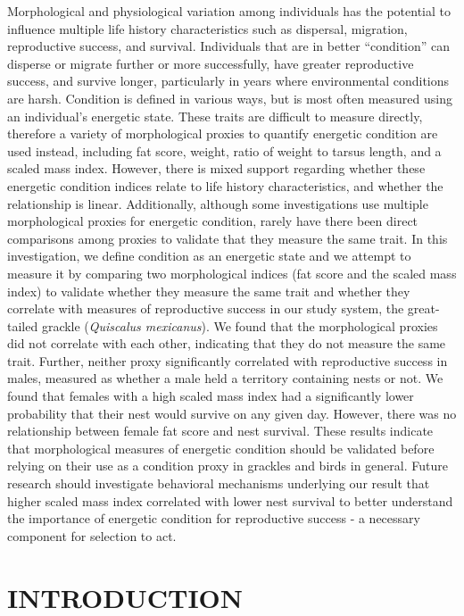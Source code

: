 \documentclass[
]{article}
\begin{document}
Morphological and physiological variation among individuals has the
potential to influence multiple life history characteristics such as
dispersal, migration, reproductive success, and survival. Individuals
that are in better ``condition'' can disperse or migrate further or more
successfully, have greater reproductive success, and survive longer,
particularly in years where environmental conditions are harsh.
Condition is defined in various ways, but is most often measured using
an individual's energetic state. These traits are difficult to measure
directly, therefore a variety of morphological proxies to quantify
energetic condition are used instead, including fat score, weight, ratio
of weight to tarsus length, and a scaled mass index. However, there is
mixed support regarding whether these energetic condition indices relate
to life history characteristics, and whether the relationship is linear.
Additionally, although some investigations use multiple morphological
proxies for energetic condition, rarely have there been direct
comparisons among proxies to validate that they measure the same trait.
In this investigation, we define condition as an energetic state and we
attempt to measure it by comparing two morphological indices (fat score
and the scaled mass index) to validate whether they measure the same
trait and whether they correlate with measures of reproductive success
in our study system, the great-tailed grackle (\emph{Quiscalus
mexicanus}). We found that the morphological proxies did not correlate
with each other, indicating that they do not measure the same trait.
Further, neither proxy significantly correlated with reproductive
success in males, measured as whether a male held a territory containing
nests or not. We found that females with a high scaled mass index had a
significantly lower probability that their nest would survive on any
given day. However, there was no relationship between female fat score
and nest survival. These results indicate that morphological measures of
energetic condition should be validated before relying on their use as a
condition proxy in grackles and birds in general. Future research should
investigate behavioral mechanisms underlying our result that higher
scaled mass index correlated with lower nest survival to better
understand the importance of energetic condition for reproductive
success - a necessary component for selection to act.

\hypertarget{introduction}{%
\section{INTRODUCTION}\label{introduction}}
\end{document}
